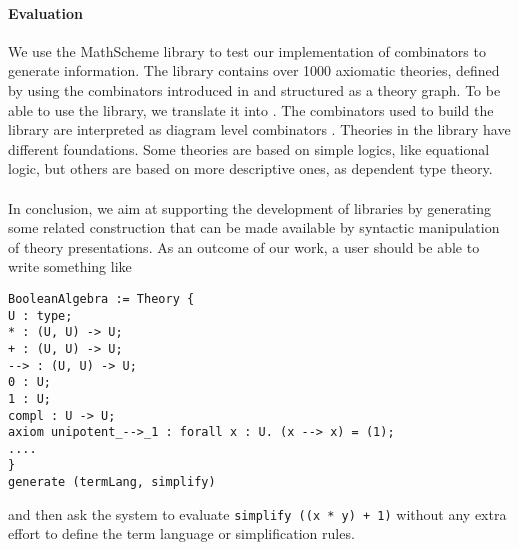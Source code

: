 \documentclass[orivec]{llncs}
\begin{document}
\paragraph{Evaluation}
We use the MathScheme library \cite{carette2011mathscheme} to test our implementation of 
combinators to generate information. The library contains over 1000 axiomatic theories, defined by 
using the combinators introduced in \cite{carette2012theory} and structured as a theory graph. To be 
able to use the library, we translate it into \mmt. The combinators used to build the library are 
interpreted as diagram level combinators \cite{rabediagram}. Theories in the library have different 
foundations. Some theories are based on simple 
logics, like equational logic, but others are based on more descriptive ones, as dependent type theory. 

\paragraph{} In conclusion, we aim at supporting the development of libraries by generating some 
related construction that can be made available by syntactic manipulation of theory presentations. As 
an outcome of our work, a user should be able to write something like 
\begin{lstlisting}
BooleanAlgebra := Theory {
U : type;
* : (U, U) -> U;
+ : (U, U) -> U;
--> : (U, U) -> U;
0 : U;
1 : U;
compl : U -> U;
axiom unipotent_-->_1 : forall x : U. (x --> x) = (1);
....
}
generate (termLang, simplify)
\end{lstlisting}
and then ask the system to evaluate \verb|simplify ((x * y) + 1)| without any extra effort to define the 
term language or simplification rules. 



\end{document}
